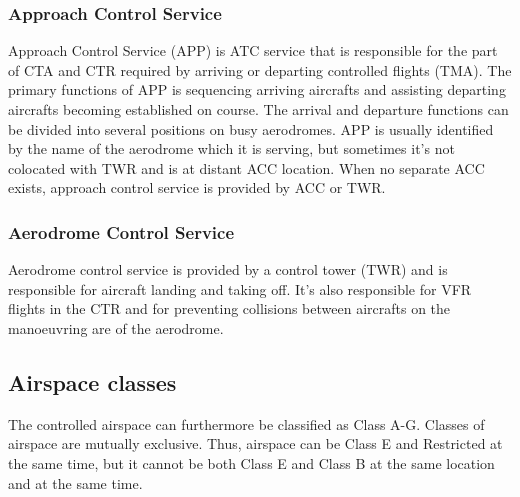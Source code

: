 \subsubsection{Approach Control Service}
Approach Control Service (APP) is ATC service that is responsible for the part of CTA and CTR required by arriving or departing controlled flights (TMA). The primary functions of APP is sequencing arriving aircrafts and assisting departing aircrafts becoming established on course. The arrival and departure functions can be divided into several positions on busy aerodromes. APP is usually identified by the name of the aerodrome which it is serving, but sometimes it's not colocated with TWR and is at distant ACC location. When no separate ACC exists, approach control service is provided by ACC or TWR. \cite[Chapter 3.2]{annex11}

\subsubsection{Aerodrome Control Service}
Aerodrome control service is provided by a control tower (TWR) and is responsible for aircraft landing and taking off. It's also responsible for VFR flights in the CTR and for preventing collisions between aircrafts on the manoeuvring are of the aerodrome. \cite[Chapter 3.2]{annex11}


\subsection{Airspace classes}


The controlled airspace can furthermore be classified as Class A-G. Classes of airspace are mutually exclusive. Thus, airspace can be Class E and Restricted at the same time, but it cannot be both Class E and Class B at the same location and at the same time. \cite{nolan}


